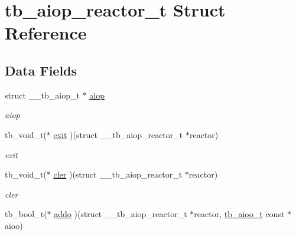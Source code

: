 \hypertarget{structtb__aiop__reactor__t}{\section{tb\-\_\-aiop\-\_\-reactor\-\_\-t Struct Reference}
\label{structtb__aiop__reactor__t}
}
\subsection*{Data Fields}
\begin{DoxyCompactItemize}
\item 
\hypertarget{structtb__aiop__reactor__t_ad36e192a36242472db40ba57e01b5343}{struct \-\_\-\-\_\-tb\-\_\-aiop\-\_\-t $\ast$ \hyperlink{structtb__aiop__reactor__t_ad36e192a36242472db40ba57e01b5343}{aiop}}\label{structtb__aiop__reactor__t_ad36e192a36242472db40ba57e01b5343}

\begin{DoxyCompactList}\small\item\em aiop \end{DoxyCompactList}\item 
\hypertarget{structtb__aiop__reactor__t_a483680521c618769351f1451c9cff78c}{tb\-\_\-void\-\_\-t($\ast$ \hyperlink{structtb__aiop__reactor__t_a483680521c618769351f1451c9cff78c}{exit} )(struct \-\_\-\-\_\-tb\-\_\-aiop\-\_\-reactor\-\_\-t $\ast$reactor)}\label{structtb__aiop__reactor__t_a483680521c618769351f1451c9cff78c}

\begin{DoxyCompactList}\small\item\em exit \end{DoxyCompactList}\item 
\hypertarget{structtb__aiop__reactor__t_ab0f31a70e20276ea334091dbf33536ba}{tb\-\_\-void\-\_\-t($\ast$ \hyperlink{structtb__aiop__reactor__t_ab0f31a70e20276ea334091dbf33536ba}{cler} )(struct \-\_\-\-\_\-tb\-\_\-aiop\-\_\-reactor\-\_\-t $\ast$reactor)}\label{structtb__aiop__reactor__t_ab0f31a70e20276ea334091dbf33536ba}

\begin{DoxyCompactList}\small\item\em cler \end{DoxyCompactList}\item 
\hypertarget{structtb__aiop__reactor__t_ac8f596afdd42b41eb31eebea6e671ad5}{tb\-\_\-bool\-\_\-t($\ast$ \hyperlink{structtb__aiop__reactor__t_ac8f596afdd42b41eb31eebea6e671ad5}{addo} )(struct \-\_\-\-\_\-tb\-\_\-aiop\-\_\-reactor\-\_\-t $\ast$reactor, \hyperlink{structtb__aioo__t}{tb\-\_\-aioo\-\_\-t} const $\ast$aioo)}\label{structtb__aiop__reactor__t_ac8f596afdd42b41eb31eebea6e671ad5}


\end{DoxyCompactItemize}

